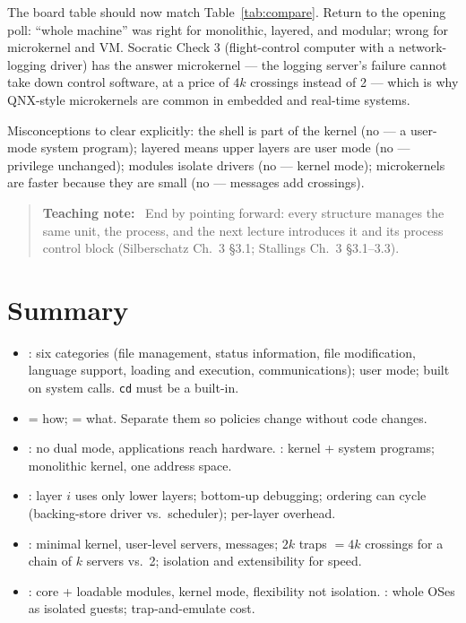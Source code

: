 \documentclass[11pt]{article}
\newenvironment{teachingaside}{\begin{quote}\small\color{primary-gold}\textbf{Teaching note:}\ }{\end{quote}}
\begin{document}
The board table should now match Table~\ref{tab:compare}. Return to the opening poll: ``whole machine'' was right for monolithic, layered, and modular; wrong for microkernel and VM. Socratic Check 3 (flight-control computer with a network-logging driver) has the answer microkernel --- the logging server's failure cannot take down control software, at a price of $4k$ crossings instead of 2 --- which is why QNX-style microkernels are common in embedded and real-time systems.

Misconceptions to clear explicitly: the shell is part of the kernel (no --- a user-mode system program); layered means upper layers are user mode (no --- privilege unchanged); modules isolate drivers (no --- kernel mode); microkernels are faster because they are small (no --- messages add crossings).

\begin{teachingaside}
End by pointing forward: every structure manages the same unit, the process, and the next lecture introduces it and its process control block (Silberschatz Ch.~3 \S3.1; Stallings Ch.~3 \S3.1--3.3).
\end{teachingaside}

\section{Summary}

\begin{itemize}
  \item {}: six categories (file management, status information, file modification, language support, loading and execution, communications); user mode; built on system calls. \texttt{cd} must be a built-in.
  \item {} = how;  = what. Separate them so policies change without code changes.
  \item {}: no dual mode, applications reach hardware. : kernel + system programs; monolithic kernel, one address space.
  \item {}: layer $i$ uses only lower layers; bottom-up debugging; ordering can cycle (backing-store driver vs.\ scheduler); per-layer overhead.
  \item {}: minimal kernel, user-level servers, messages; $2k$ traps $= 4k$ crossings for a chain of $k$ servers vs.\ 2; isolation and extensibility for speed.
  \item {}: core + loadable modules, kernel mode, flexibility not isolation. : whole OSes as isolated guests; trap-and-emulate cost.
\end{itemize}
\end{document}
